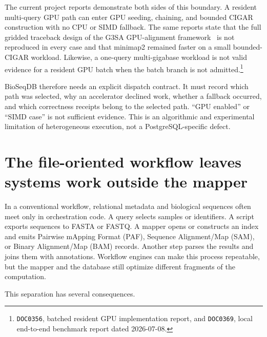 The current project reports demonstrate both sides of this boundary.  A
resident multi-query GPU path can enter GPU seeding, chaining, and bounded
CIGAR construction with no CPU or SIMD fallback.  The same reports state
that the full gridded traceback design of the G3SA GPU-alignment
framework~{\hypersetup{citecolor=black}\cite{g3sa_paper}} is not reproduced
in every case and that
minimap2 remained faster on a small bounded-CIGAR workload.
Likewise, a one-query multi-gigabase workload is not valid evidence for a
resident GPU batch when the batch branch is not admitted.\footnote{
\texttt{DOC0356}, batched resident GPU implementation report, and
\texttt{DOC0369}, local end-to-end benchmark report dated 2026-07-08.}

BioSeqDB therefore needs an explicit dispatch contract.  It must record
which path was selected, why an accelerator declined work, whether a
fallback occurred, and which correctness receipts belong to the selected
path.  ``GPU enabled'' or ``SIMD case'' is not sufficient evidence.
This is an algorithmic and experimental limitation of heterogeneous
execution, not a PostgreSQL-specific defect.

\section{The file-oriented workflow leaves systems work outside the mapper}
\label{sec:file-workflow-gap}

In a conventional workflow, relational metadata and biological sequences
often meet only in orchestration code.  A query selects samples or
identifiers.  A script exports sequences to FASTA or FASTQ.  A mapper
opens or constructs an index and emits Pairwise mApping Format (PAF),
Sequence Alignment/Map (SAM), or Binary Alignment/Map (BAM) records.  Another step
parses the results and joins them with annotations.  Workflow engines can
make this process repeatable, but the mapper and the database still
optimize different fragments of the computation.

This separation has several consequences.

